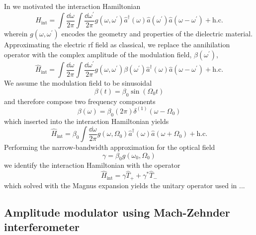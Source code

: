 In  we motivated the interaction Hamiltonian
\begin{equation}
	\hat{H}_\text{int}
	=
	\int\frac{\dd{\omega}}{2\pi}
	\int\frac{\dd{\omega^\prime}}{2\pi}
	g(\omega,\omega^\prime)
	\hat{a}^\dagger(\omega)
	\hat{a}(\omega^\prime)
	\hat{a}(\omega-\omega^\prime)
	+
	\text{h.c.}
\end{equation}
wherein $g(\omega,\omega^\prime)$ encodes the geometry and properties of the dielectric material.
Approximating the electric \gls{rf} field as classical, we replace the annihilation operator with the complex amplitude of the modulation field, $\beta(\omega^\prime)$,
\begin{equation}
	\hat{H}_\text{int}
	=
	\int\frac{\dd{\omega}}{2\pi}
	\int\frac{\dd{\omega^\prime}}{2\pi}
	g(\omega,\omega^\prime)
	\beta(\omega^\prime)
	\hat{a}^\dagger(\omega)
	\hat{a}(\omega-\omega^\prime)
	+
	\text{h.c.}
\end{equation}
We assume the modulation field to be sinusoidal
\begin{equation}
	\beta(t)
	=
	\beta_0
	\sin(\Omega_0t)
\end{equation}
and therefore compose two frequency components
\begin{equation}
	\beta(\omega)
	=
	\beta_0
	(2\pi)
	\delta^{(1)}(\omega-\Omega_0)
\end{equation}
which inserted into the interaction Hamiltonian yields
\begin{equation}
	\hat{H}_\text{int}
	=
	\beta_0
	\int\frac{\dd{\omega}}{2\pi}
	g(\omega,\Omega_0)
	\hat{a}^\dagger(\omega)
	\hat{a}(\omega+\Omega_0)
	+
	\text{h.c.}
\end{equation}
Performing the narrow-bandwidth approximation for the optical field
\begin{equation}
	\gamma
	=
	\beta_0
	g(\omega_0,\Omega_0)
\end{equation}
we identify the interaction Hamiltonian with the operator
\begin{equation}
	\hat{H}_\text{int}
	=
	\gamma
	\hat{T}_+
	+
	\gamma^*
	\hat{T}_-	
\end{equation}
which solved with the Magnus expansion yields the unitary operator used in ...

\subsection{Amplitude modulator using Mach-Zehnder interferometer}

